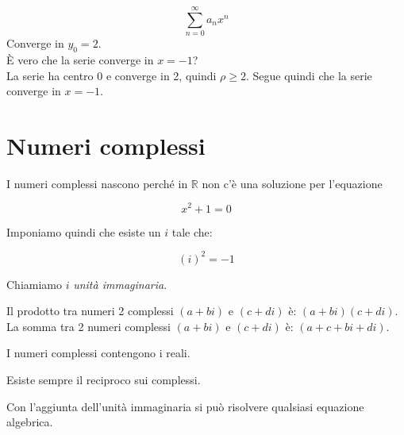 \begin{esempio}[]

  \begin{equation}
    \sum_{n=0}^{\infty}a_nx^n
  \end{equation}
  Converge in $y_0=2$. \\
  È vero che la serie converge in $x=-1$? \\
  La serie ha centro 0 e converge in 2, quindi $\rho \geq 2$. Segue quindi che la serie converge in $x=-1$.

\end{esempio}


\chapter{Numeri complessi}\label{chap:numeri_complessi}

I numeri complessi nascono perché in $\mathbb{R}$ non c'è una soluzione per l'equazione

\begin{equation}
  x^2+1=0
  \label{eq:complex_origin}
\end{equation}

Imponiamo quindi che esiste un $i$ tale che:
\begin{definizione}
  \begin{equation}
    (i)^2=-1
    \label{eq:i}
  \end{equation}

  Chiamiamo $i$ \textit{unità immaginaria}.
\end{definizione}



\begin{definizione}
  Il prodotto tra numeri 2 complessi $(a+bi)$ e $(c+di)$ è: $(a+bi)(c+di)$. \\
  La somma tra 2 numeri complessi $(a+bi)$ e $(c+di)$ è: $(a+c+bi+di)$.
\end{definizione}

\begin{osservazione}[]
  I numeri complessi contengono i reali.
\end{osservazione}
\begin{osservazione}[]
  Esiste sempre il reciproco sui complessi.
\end{osservazione}

\begin{proprietà}[]
  Con l'aggiunta dell'unità immaginaria si può risolvere qualsiasi equazione algebrica.
\end{proprietà}

